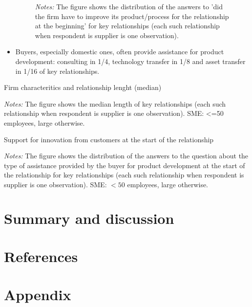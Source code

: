 \documentclass[final, dvipsnames, authoryear,12pt]{elsarticle}
\begin{document}
\begin{itemize}
\begin{figure}[h]
\begin{center}
\begin{subfloat}
    \end{subfloat}
    \end{center}
    {\footnotesize \textit{Notes:} The figure shows the distribution of the answers to ’did the firm have to improve its product/process for the relationship at the beginning’ for key relationships (each such relationship when respondent is supplier is one observation).}     
\end{figure}   
    

    \item Buyers, especially domestic ones, often provide assistance for product development: consulting in 1/4, technology transfer in 1/8 and asset transfer in 1/16 of key relationships.
\end{itemize}
    
\begin{table}[h]
    \caption{Firm characteritics and relationship lenght (median)}
    \label{tab:char_length}    
    
    {\scriptsize \textit{Notes:} The figure shows the median length of key relationships (each such relationship when respondent is supplier is one observation). SME: <=50 employees, large otherwise.}
\end{table}


\begin{table}[h]
    \caption{Support for innovation from customers at the start of the relationship}
    \label{tab:start_support}
    
    {\scriptsize \textit{Notes:} The figure shows the distribution of the answers to the question about the type of assistance provided by the buyer for product development at the start of the relationship for key relationships (each such relationship when respondent is supplier is one observation). SME: $<50$ employees, large otherwise.}
\end{table}



\section{Summary and discussion}




\section{References}




\appendix
\section{Appendix}
\end{document}
